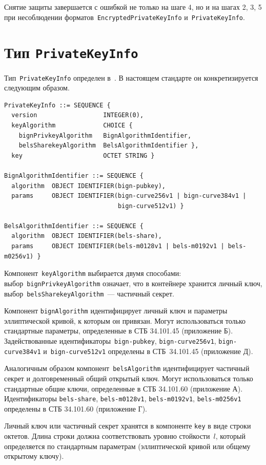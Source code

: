 Снятие защиты завершается с ошибкой не только на шаге 4, но и на 
шагах 2, 3, 5 при несоблюдении форматов~\texttt{EncryptedPrivateKeyInfo} 
и~\texttt{PrivateKeyInfo}. 

\section{Тип \texttt{PrivateKeyInfo}}\label{CONT.PT}

Тип~\texttt{PrivateKeyInfo} определен в~\cite{PKCS8}.
В настоящем стандарте он конкретизируется следующим образом.
%
\begin{verbatim}
PrivateKeyInfo ::= SEQUENCE {
  version                  INTEGER(0),
  keyAlgorithm             CHOICE {
    bignPrivkeyAlgorithm   BignAlgorithmIdentifier,
    belsSharekeyAlgorithm  BelsAlgorithmIdentifier },
  key                      OCTET STRING }

BignAlgorithmIdentifier ::= SEQUENCE {
  algorithm  OBJECT IDENTIFIER(bign-pubkey),
  params     OBJECT IDENTIFIER(bign-curve256v1 | bign-curve384v1 | 
                               bign-curve512v1) }

BelsAlgorithmIdentifier ::= SEQUENCE {
  algorithm  OBJECT IDENTIFIER(bels-share),
  params     OBJECT IDENTIFIER(bels-m0128v1 | bels-m0192v1 | bels-m0256v1) }
\end{verbatim}

Компонент~\texttt{keyAlgorithm} выбирается двумя способами:
выбор~\texttt{bignPrivkeyAlgorithm} означает, что в контейнере хранится личный 
ключ, выбор~\texttt{belsSharekeyAlgorithm}~--- частичный секрет. 

Компонент \texttt{bignAlgorithm} идентифицирует личный ключ и параметры 
эллиптической кривой, к которым он привязан. Могут использоваться
только стандартные параметры, определенные в СТБ 34.101.45 (приложение Б). 
%
Задействованные идентификаторы~\texttt{bign-pubkey}, 
\texttt{bign-curve256v1}, \texttt{bign-curve384v1} 
и~\texttt{bign-curve512v1} определены в СТБ~34.101.45 (приложение Д).

Аналогичным образом компонент~\texttt{belsAlgorithm} идентифицирует 
частичный секрет и долговременный общий открытый ключ. 
Могут использоваться только стандартные общие ключи, 
определенные в СТБ 34.101.60 (приложение А). 
Идентификаторы \texttt{bels-share}, \texttt{bels-m0128v1}, 
\texttt{bels-m0192v1}, \texttt{bels-m0256v1} определены в СТБ 34.101.60 
(приложение Г).

Личный ключ или частичный секрет хранятся в компоненте \texttt{key}
в виде строки октетов. Длина строки должна соответствовать уровню
стойкости~$l$, который определяется по стандартным параметрам
(эллиптической кривой или общему открытому ключу).

